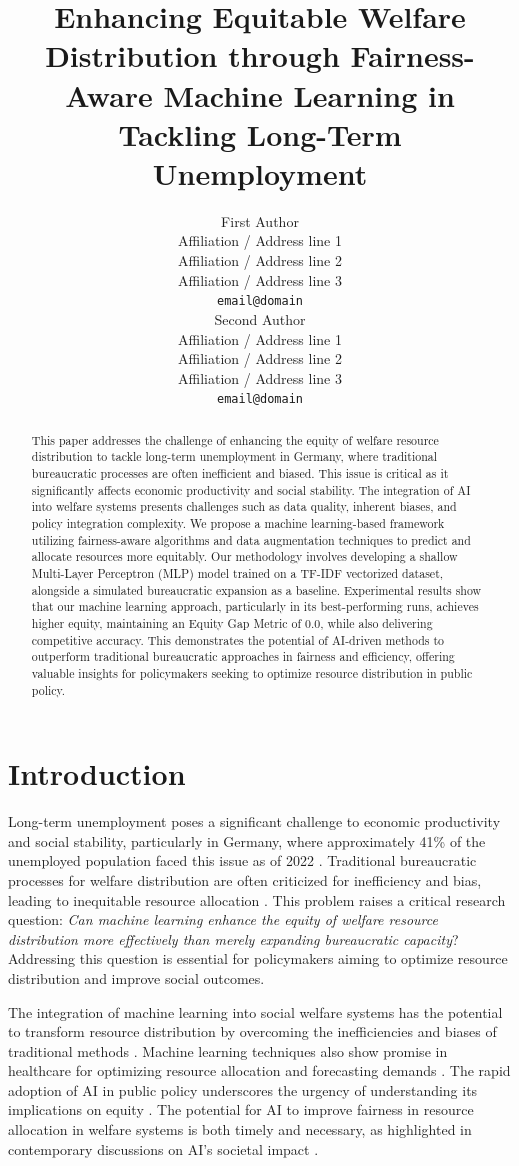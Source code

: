 \documentclass{article} %
\title{Enhancing Equitable Welfare Distribution through Fairness-Aware Machine Learning in Tackling Long-Term Unemployment}
\author{First Author \\
  Affiliation / Address line 1 \\
  Affiliation / Address line 2 \\
  Affiliation / Address line 3 \\
  \texttt{email@domain} \\\And
  Second Author \\
  Affiliation / Address line 1 \\
  Affiliation / Address line 2 \\
  Affiliation / Address line 3 \\
  \texttt{email@domain} \\}
\begin{document}
\maketitle
\begin{abstract}
This paper addresses the challenge of enhancing the equity of welfare resource distribution to tackle long-term unemployment in Germany, where traditional bureaucratic processes are often inefficient and biased. This issue is critical as it significantly affects economic productivity and social stability. The integration of AI into welfare systems presents challenges such as data quality, inherent biases, and policy integration complexity. We propose a machine learning-based framework utilizing fairness-aware algorithms and data augmentation techniques to predict and allocate resources more equitably. Our methodology involves developing a shallow Multi-Layer Perceptron (MLP) model trained on a TF-IDF vectorized dataset, alongside a simulated bureaucratic expansion as a baseline. Experimental results show that our machine learning approach, particularly in its best-performing runs, achieves higher equity, maintaining an Equity Gap Metric of 0.0, while also delivering competitive accuracy. This demonstrates the potential of AI-driven methods to outperform traditional bureaucratic approaches in fairness and efficiency, offering valuable insights for policymakers seeking to optimize resource distribution in public policy.
\end{abstract}


\section{Introduction}

Long-term unemployment poses a significant challenge to economic productivity and social stability, particularly in Germany, where approximately 41\% of the unemployed population faced this issue as of 2022 . Traditional bureaucratic processes for welfare distribution are often criticized for inefficiency and bias, leading to inequitable resource allocation \citep{active2019}. This problem raises a critical research question: \textit{Can machine learning enhance the equity of welfare resource distribution more effectively than merely expanding bureaucratic capacity}? Addressing this question is essential for policymakers aiming to optimize resource distribution and improve social outcomes.

The integration of machine learning into social welfare systems has the potential to transform resource distribution by overcoming the inefficiencies and biases of traditional methods \citep{healthcare2024,balancing2020,big2025}. Machine learning techniques also show promise in healthcare for optimizing resource allocation and forecasting demands \citep{forecasting2025,optimizing2024}. The rapid adoption of AI in public policy underscores the urgency of understanding its implications on equity \citep{designing2023,equitable2025}. The potential for AI to improve fairness in resource allocation in welfare systems is both timely and necessary, as highlighted in contemporary discussions on AI's societal impact \citep{ai2023,statistical2024}.
\end{document}
